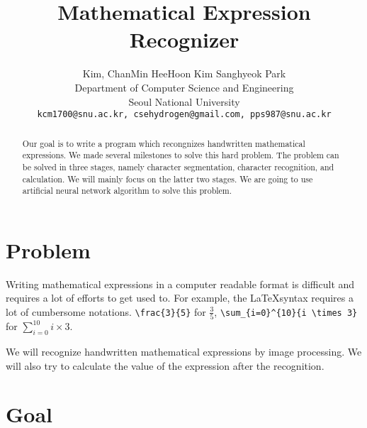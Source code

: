 \documentclass[10pt,twocolumn,letterpaper]{article}
\begin{document}
\title{Mathematical Expression Recognizer}

\author{Kim, ChanMin \qquad HeeHoon Kim \qquad Sanghyeok Park\\
Department of Computer Science and Engineering\\
Seoul National University\\
{\tt\small kcm1700@snu.ac.kr, csehydrogen@gmail.com, pps987@snu.ac.kr}
}

\maketitle

\begin{abstract}

Our goal is to write a program which recongnizes handwritten mathematical expressions.
We made several milestones to solve this hard problem.
The problem can be solved in three stages, namely character segmentation, character recognition, and calculation.
We will mainly focus on the latter two stages.
We are going to use artificial neural network algorithm to solve this problem.

\end{abstract}

\section{Problem}

Writing mathematical expressions in a computer readable format is difficult and requires a lot of efforts to get used to.
For example, the \LaTeX syntax requires a lot of cumbersome notations. \verb'\frac{3}{5}' for $\frac{3}{5}$, \verb'\sum_{i=0}^{10}{i \times 3}' for $\sum_{i=0}^{10}{i \times 3}$.

We will recognize handwritten mathematical expressions by image processing.
We will also try to calculate the value of the expression after the recognition.



\section{Goal}
\end{document}
